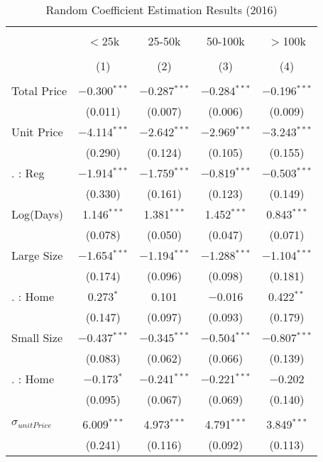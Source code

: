 \begin{table}[!htbp] \centering
  \caption{Random Coefficient Estimation Results (2016)}
  \label{tab:mlogit2016_Random}
\begin{tabular}{@{\extracolsep{5pt}}lcccc}
\\[-1.8ex]\hline
\hline \\[-1.8ex]
 & $<$25k & 25-50k & 50-100k & $>$100k \\
\\[-1.8ex] & (1) & (2) & (3) & (4)\\
\hline \\[-1.8ex]
 Total Price & $-$0.300$^{***}$ & $-$0.287$^{***}$ & $-$0.284$^{***}$ & $-$0.196$^{***}$ \\
  & (0.011) & (0.007) & (0.006) & (0.009) \\
  Unit Price & $-$4.114$^{***}$ & $-$2.642$^{***}$ & $-$2.969$^{***}$ & $-$3.243$^{***}$ \\
  & (0.290) & (0.124) & (0.105) & (0.155) \\
  . : Reg & $-$1.914$^{***}$ & $-$1.759$^{***}$ & $-$0.819$^{***}$ & $-$0.503$^{***}$ \\
  & (0.330) & (0.161) & (0.123) & (0.149) \\
  Log(Days) & 1.146$^{***}$ & 1.381$^{***}$ & 1.452$^{***}$ & 0.843$^{***}$ \\
  & (0.078) & (0.050) & (0.047) & (0.071) \\
  Large Size & $-$1.654$^{***}$ & $-$1.194$^{***}$ & $-$1.288$^{***}$ & $-$1.104$^{***}$ \\
  & (0.174) & (0.096) & (0.098) & (0.181) \\
  . : Home & 0.273$^{*}$ & 0.101 & $-$0.016 & 0.422$^{**}$ \\
  & (0.147) & (0.097) & (0.093) & (0.179) \\
  Small Size & $-$0.437$^{***}$ & $-$0.345$^{***}$ & $-$0.504$^{***}$ & $-$0.807$^{***}$ \\
  & (0.083) & (0.062) & (0.066) & (0.139) \\
  . : Home & $-$0.173$^{*}$ & $-$0.241$^{***}$ & $-$0.221$^{***}$ & $-$0.202 \\
  & (0.095) & (0.067) & (0.069) & (0.140) \\
 \hline \\[-1.8ex]
   $\sigma_{unitPrice}$ & 6.009$^{***}$ & 4.973$^{***}$ & 4.791$^{***}$ & 3.849$^{***}$ \\
                      & (0.241)      & (0.116)           & (0.092)       & (0.113) \\

\end{tabular}
\end{table}

